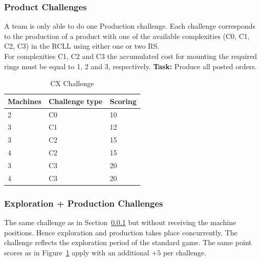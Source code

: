 \documentclass[12pt,twoside]{article}
\newcommand{\refsec}[1]{Section~\ref{#1}}
\newcommand{\reffig}[1]{Figure~\ref{#1}}
\begin{document}
\subsubsection{Product Challenges}\label{sec:challenge-cx}
A team is only able to do one Production challenge. Each challenge corresponds
to the production of a product with one of the
available complexities (C0, C1, C2, C3) in the \ac{RCLL} using either
one or two \ac{RS}.\\
For complexities C1, C2 and C3 the accumulated cost for mounting the required
rings must be equal to 1, 2 and 3, respectively.
\textbf{Task:} Produce all posted orders.\\
\begin{table}[!htb]
 \centering
 \begin{tabular}{l|l|l}
  Machines & Challenge type & Scoring \\\hline
  2 & C0 & 10 \\
  3 & C1 & 12 \\
  3 & C2 & 15 \\
  4 & C2 & 15 \\
  3 & C3 & 20 \\
  4 & C3 & 20 \\
 \end{tabular}
 \caption{CX Challenge}
 \label{tab:challenge-cx}
\end{table}

\subsubsection{Exploration + Production Challenges}\label{sec:challenge-combine-exp-c0} %
The same challenge as in \refsec{sec:challenge-cx} but without receiving the
machine positions. Hence exploration and production takes place concurrently.
The challenge reflects the exploration period of the standard game.
The same point scores as in \reffig{tab:challenge-cx} apply with an additional
$+5$ per challenge.
\end{document}

